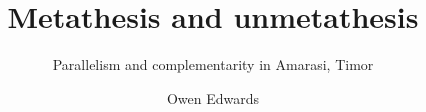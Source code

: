 \author{Owen Edwards}
\title{Metathesis and unmetathesis}
\subtitle{Parallelism and complementarity in Amarasi, Timor}
\renewcommand{\lsSeries}{sidl}
\renewcommand{\lsSeriesNumber}{}

